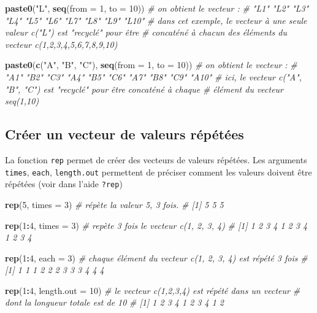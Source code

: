 \documentclass[
]{book}
\newenvironment{Shaded}{\begin{snugshade}}{\end{snugshade}}
\newcommand{\AttributeTok}[1]{\textcolor[rgb]{0.13,0.29,0.53}{#1}}
\newcommand{\CommentTok}[1]{\textcolor[rgb]{0.56,0.35,0.01}{\textit{#1}}}
\newcommand{\DecValTok}[1]{\textcolor[rgb]{0.00,0.00,0.81}{#1}}
\newcommand{\FunctionTok}[1]{\textcolor[rgb]{0.13,0.29,0.53}{\textbf{#1}}}
\newcommand{\NormalTok}[1]{#1}
\newcommand{\SpecialCharTok}[1]{\textcolor[rgb]{0.81,0.36,0.00}{\textbf{#1}}}
\newcommand{\StringTok}[1]{\textcolor[rgb]{0.31,0.60,0.02}{#1}}
\begin{document}
\begin{Shaded}
\begin{Highlighting}[]
\FunctionTok{paste0}\NormalTok{(}\StringTok{"L"}\NormalTok{, }\FunctionTok{seq}\NormalTok{(}\AttributeTok{from =} \DecValTok{1}\NormalTok{, }\AttributeTok{to =} \DecValTok{10}\NormalTok{)) }
\CommentTok{\# on obtient le vecteur :}
\CommentTok{\# "L1"  "L2"  "L3"  "L4"  "L5"  "L6"  "L7"  "L8"  "L9"  "L10"}
\CommentTok{\# dans cet exemple, le vecteur à une seule valeur c("L") est "recyclé" pour être}
\CommentTok{\# concaténé à chacun des éléments du vecteur c(1,2,3,4,5,6,7,8,9,10)}

\FunctionTok{paste0}\NormalTok{(}\FunctionTok{c}\NormalTok{(}\StringTok{"A"}\NormalTok{, }\StringTok{"B"}\NormalTok{, }\StringTok{"C"}\NormalTok{), }\FunctionTok{seq}\NormalTok{(}\AttributeTok{from =} \DecValTok{1}\NormalTok{, }\AttributeTok{to =} \DecValTok{10}\NormalTok{))}
\CommentTok{\# on obtient le vecteur : }
\CommentTok{\# "A1"  "B2"  "C3"  "A4"  "B5"  "C6"  "A7"  "B8"  "C9"  "A10"}
\CommentTok{\# ici, le vecteur c("A", "B", "C") est "recyclé" pour être concaténé à chaque }
\CommentTok{\# élément du vecteur seq(1,10)}
\end{Highlighting}
\end{Shaded}

\subsection{Créer un vecteur de valeurs répétées}\label{cruxe9er-un-vecteur-de-valeurs-ruxe9puxe9tuxe9es}

La fonction \texttt{rep} permet de créer des vecteurs de valeurs répétées.
Les arguments \texttt{times}, \texttt{each}, \texttt{length.out} permettent de préciser comment les valeurs doivent être répétées (voir dans l'aide \texttt{?rep})

\begin{Shaded}
\begin{Highlighting}[]
\FunctionTok{rep}\NormalTok{(}\DecValTok{5}\NormalTok{, }\AttributeTok{times =} \DecValTok{3}\NormalTok{) }\CommentTok{\# répète la valeur 5, 3 fois.}
\CommentTok{\# [1] 5 5 5}

\FunctionTok{rep}\NormalTok{(}\DecValTok{1}\SpecialCharTok{:}\DecValTok{4}\NormalTok{, }\AttributeTok{times =} \DecValTok{3}\NormalTok{) }\CommentTok{\# repète 3 fois le vecteur c(1, 2, 3, 4)}
\CommentTok{\# [1] 1 2 3 4 1 2 3 4 1 2 3 4}

\FunctionTok{rep}\NormalTok{(}\DecValTok{1}\SpecialCharTok{:}\DecValTok{4}\NormalTok{, }\AttributeTok{each =} \DecValTok{3}\NormalTok{) }\CommentTok{\# chaque élément du vecteur c(1, 2, 3, 4) est répété 3 fois}
\CommentTok{\# [1] 1 1 1 2 2 2 3 3 3 4 4 4}

\FunctionTok{rep}\NormalTok{(}\DecValTok{1}\SpecialCharTok{:}\DecValTok{4}\NormalTok{, }\AttributeTok{length.out =} \DecValTok{10}\NormalTok{) }\CommentTok{\# le vecteur c(1,2,3,4) est répété dans un vecteur }
                          \CommentTok{\# dont la longueur totale est de 10}
\CommentTok{\# [1] 1 2 3 4 1 2 3 4 1 2}
\end{Highlighting}
\end{Shaded}
\end{document}
